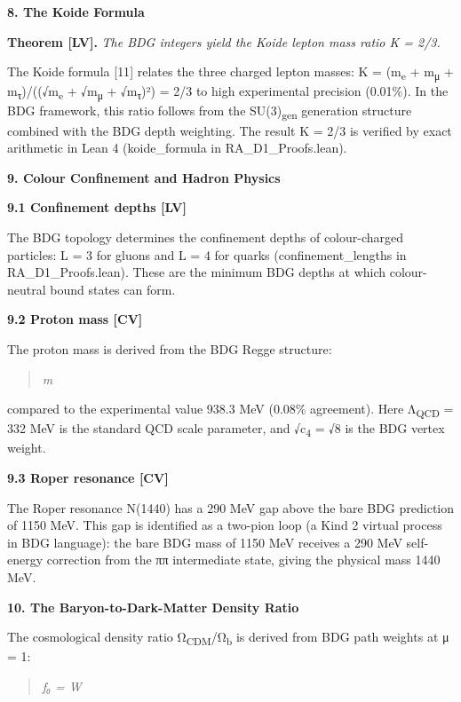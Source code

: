 \documentclass[12pt,a4paper]{article}
\begin{document}
\textbf{8. The Koide Formula}

\textbf{Theorem {[}LV{]}.} \emph{The BDG integers yield the Koide lepton
mass ratio K = 2/3.}

The Koide formula {[}11{]} relates the three charged lepton masses: K =
(m\textsubscript{e} + m\textsubscript{μ} +
m\textsubscript{τ})/((√m\textsubscript{e} + √m\textsubscript{μ} +
√m\textsubscript{τ})²) = 2/3 to high experimental precision (0.01\%). In
the BDG framework, this ratio follows from the SU(3)\textsubscript{gen}
generation structure combined with the BDG depth weighting. The result K
= 2/3 is verified by exact arithmetic in Lean 4 (koide\_formula in
RA\_D1\_Proofs.lean).

\textbf{9. Colour Confinement and Hadron Physics}

\textbf{9.1 Confinement depths {[}LV{]}}

The BDG topology determines the confinement depths of colour-charged
particles: L = 3 for gluons and L = 4 for quarks (confinement\_lengths
in RA\_D1\_Proofs.lean). These are the minimum BDG depths at which
colour-neutral bound states can form.

\textbf{9.2 Proton mass {[}CV{]}}

The proton mass is derived from the BDG Regge structure:

\begin{quote}
\emph{m}
\end{quote}

compared to the experimental value 938.3 MeV (0.08\% agreement). Here
Λ\textsubscript{QCD} = 332 MeV is the standard QCD scale parameter, and
√c\textsubscript{4} = √8 is the BDG vertex weight.

\textbf{9.3 Roper resonance {[}CV{]}}

The Roper resonance N(1440) has a 290 MeV gap above the bare BDG
prediction of 1150 MeV. This gap is identified as a two-pion loop (a
Kind 2 virtual process in BDG language): the bare BDG mass of 1150 MeV
receives a 290 MeV self-energy correction from the ππ intermediate
state, giving the physical mass 1440 MeV.

\textbf{10. The Baryon-to-Dark-Matter Density Ratio}

The cosmological density ratio Ω\textsubscript{CDM}/Ω\textsubscript{b}
is derived from BDG path weights at μ = 1:

\begin{quote}
\emph{f₀ = W}
\end{quote}
\end{document}
